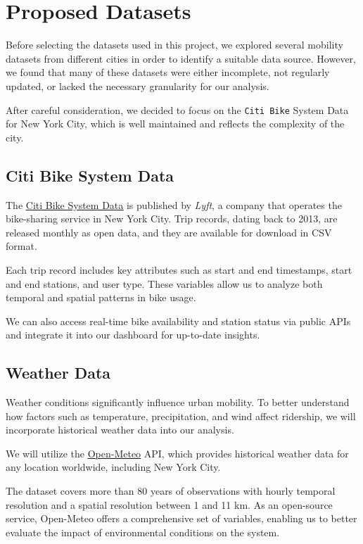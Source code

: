 \section{Proposed Datasets}
Before selecting the datasets used in this project, we explored several mobility datasets from different cities in order to identify a suitable data source.
However, we found that many of these datasets were either incomplete, not regularly updated, or lacked the necessary granularity for our analysis.

After careful consideration, we decided to focus on the \texttt{Citi Bike} System Data for New York City, which is well maintained and reflects the complexity of the city.

\subsection{Citi Bike System Data}
The \href{https://citibikenyc.com/system-data}{\underline{Citi Bike System Data}} is published by \textit{Lyft}, a company that operates the bike-sharing service in New York City.
Trip records, dating back to 2013, are released monthly as open data, and they are available for download in CSV format.

Each trip record includes key attributes such as start and end timestamps, start and end stations, and user type.
These variables allow us to analyze both temporal and spatial patterns in bike usage.

We can also access real-time bike availability and station status via public APIs and integrate it into our dashboard for up-to-date insights.

\subsection{Weather Data}
Weather conditions significantly influence urban mobility. To better understand how factors such as temperature, 
precipitation, and wind affect ridership, we will incorporate historical weather data into our analysis.

We will utilize the \href{https://open-meteo.com/}{\underline{Open-Meteo}} API, which provides historical weather data for any location worldwide, including New York City.

The dataset covers more than 80 years of observations with hourly temporal resolution and a spatial resolution between 1 and 11 km.
As an open-source service, Open-Meteo offers a comprehensive set of variables, enabling us to better evaluate the impact of environmental conditions on the system.

